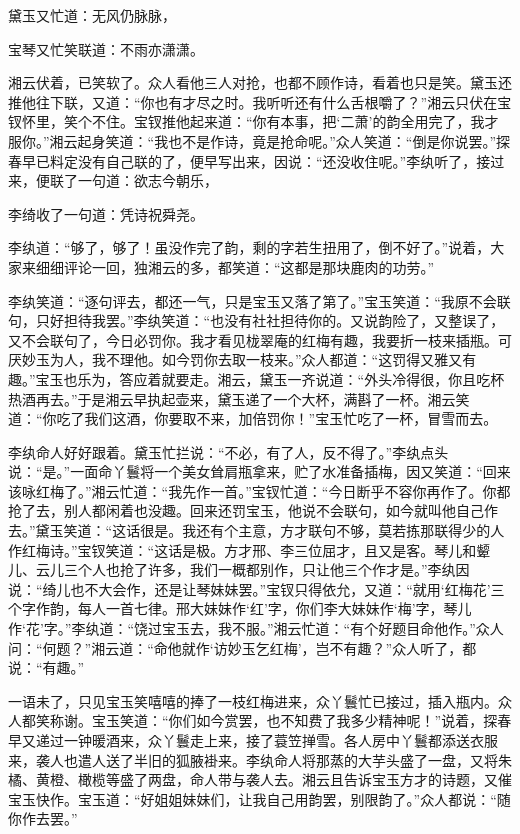 \documentclass[12pt,oneside]{book}
\begin{document}
黛玉又忙道：无风仍脉脉，

宝琴又忙笑联道：不雨亦潇潇。

湘云伏着，已笑软了。众人看他三人对抢，也都不顾作诗，看着也只是笑。黛玉还推他往下联，又道：“你也有才尽之时。我听听还有什么舌根嚼了？”湘云只伏在宝钗怀里，笑个不住。宝钗推他起来道：“你有本事，把‘二萧’的韵全用完了，我才服你。”湘云起身笑道：“我也不是作诗，竟是抢命呢。”众人笑道：“倒是你说罢。”探春早已料定没有自己联的了，便早写出来，因说：“还没收住呢。”李纨听了，接过来，便联了一句道：欲志今朝乐，

李绮收了一句道：凭诗祝舜尧。

李纨道：“够了，够了！虽没作完了韵，剩的字若生扭用了，倒不好了。”说着，大家来细细评论一回，独湘云的多，都笑道：“这都是那块鹿肉的功劳。”

李纨笑道：“逐句评去，都还一气，只是宝玉又落了第了。”宝玉笑道：“我原不会联句，只好担待我罢。”李纨笑道：“也没有社社担待你的。又说韵险了，又整误了，又不会联句了，今日必罚你。我才看见栊翠庵的红梅有趣，我要折一枝来插瓶。可厌妙玉为人，我不理他。如今罚你去取一枝来。”众人都道：“这罚得又雅又有趣。”宝玉也乐为，答应着就要走。湘云，黛玉一齐说道：“外头冷得很，你且吃杯热酒再去。”于是湘云早执起壶来，黛玉递了一个大杯，满斟了一杯。湘云笑道：“你吃了我们这酒，你要取不来，加倍罚你！”宝玉忙吃了一杯，冒雪而去。

李纨命人好好跟着。黛玉忙拦说：“不必，有了人，反不得了。”李纨点头说：“是。”一面命丫鬟将一个美女耸肩瓶拿来，贮了水准备插梅，因又笑道：“回来该咏红梅了。”湘云忙道：“我先作一首。”宝钗忙道：“今日断乎不容你再作了。你都抢了去，别人都闲着也没趣。回来还罚宝玉，他说不会联句，如今就叫他自己作去。”黛玉笑道：“这话很是。我还有个主意，方才联句不够，莫若拣那联得少的人作红梅诗。”宝钗笑道：“这话是极。方才邢、李三位屈才，且又是客。琴儿和颦儿、云儿三个人也抢了许多，我们一概都别作，只让他三个作才是。”李纨因说：“绮儿也不大会作，还是让琴妹妹罢。”宝钗只得依允，又道：“就用‘红梅花’三个字作韵，每人一首七律。邢大妹妹作‘红’字，你们李大妹妹作‘梅’字，琴儿作‘花’字。”李纨道：“饶过宝玉去，我不服。”湘云忙道：“有个好题目命他作。”众人问：“何题？”湘云道：“命他就作‘访妙玉乞红梅’，岂不有趣？”众人听了，都说：“有趣。”

一语未了，只见宝玉笑嘻嘻的捧了一枝红梅进来，众丫鬟忙已接过，插入瓶内。众人都笑称谢。宝玉笑道：“你们如今赏罢，也不知费了我多少精神呢！”说着，探春早又递过一钟暖酒来，众丫鬟走上来，接了蓑笠掸雪。各人房中丫鬟都添送衣服来，袭人也遣人送了半旧的狐腋褂来。李纨命人将那蒸的大芋头盛了一盘，又将朱橘、黄橙、橄榄等盛了两盘，命人带与袭人去。湘云且告诉宝玉方才的诗题，又催宝玉快作。宝玉道：“好姐姐妹妹们，让我自己用韵罢，别限韵了。”众人都说：“随你作去罢。”
\end{document}
